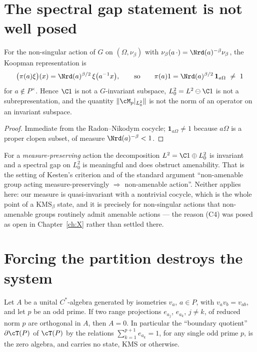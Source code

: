 \section{The spectral gap statement is not well posed}

\begin{proposition}\label{XI:prop:notinvariant}
For the non-singular action of $G$ on $(\Omega,\nu_\beta)$ with
$\nu_\beta(a\,\cdot)=\Nrd(a)^{-\beta}\nu_\beta$, the Koopman representation is
\[
\bigl(\pi(a)\xi\bigr)(x)=\Nrd(a)^{\beta/2}\,\xi\bigl(a^{-1}x\bigr),
\qquad\text{so}\qquad
\pi(a)1=\Nrd(a)^{\beta/2}\,\mathbf 1_{a\Omega}\ \ne\ 1
\]
for $a\notin P^\times$. Hence $\C1$ is not a $G$-invariant subspace, $L^2_0=L^2\ominus\C1$ is
not a subrepresentation, and the quantity $\|\cM_p|_{L^2_0}\|$ is not the norm of an operator
on an invariant subspace.
\end{proposition}

\begin{proof}
Immediate from the Radon--Nikodym cocycle; $\mathbf 1_{a\Omega}\ne1$ because $a\Omega$ is a
proper clopen subset, of measure $\Nrd(a)^{-\beta}<1$.
\end{proof}

\begin{remark}\label{XI:rem:whymatters}
For a \emph{measure-preserving} action the decomposition $L^2=\C1\oplus L^2_0$ is invariant
and a spectral gap on $L^2_0$ is meaningful and does obstruct amenability. That is the
setting of Kesten's criterion and of the standard argument ``non-amenable group acting
measure-preservingly $\Rightarrow$ non-amenable action''. Neither applies here: our measure is
quasi-invariant with a nontrivial cocycle, which is the whole point of a
$\mathrm{KMS}_\beta$ state, and it is precisely for non-singular actions that non-amenable
groups routinely admit amenable actions \cite{AD,Zimmer} --- the reason (C4) was posed as
open in Chapter~\ref{ch:X} rather than settled there.
\end{remark}

\section{Forcing the partition destroys the system}

\begin{theorem}\label{XI:thm:noboundary}
Let $A$ be a unital $C^*$-algebra generated by isometries $v_a$, $a\in P$, with
$v_av_b=v_{ab}$, and let $p$ be an odd prime. If two range projections $e_{a_j}$, $e_{a_k}$,
$j\ne k$, of reduced norm $p$ are orthogonal in $A$, then $A=0$. In particular the
``boundary quotient'' $\partial\cT(P)$ of $\cT(P)$ by the relations
$\sum_{k=1}^{p+1}e_{a_k}=1$, for any single odd prime $p$, is the zero algebra, and carries
no state, $\mathrm{KMS}$ or otherwise.
\end{theorem}

